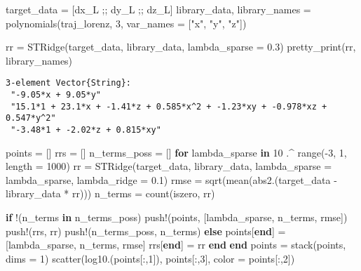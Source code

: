 \documentclass[
]{article}
\newenvironment{Shaded}{\begin{snugshade}}{\end{snugshade}}
\newcommand{\ControlFlowTok}[1]{\textcolor[rgb]{0.00,0.23,0.31}{\textbf{#1}}}
\newcommand{\FloatTok}[1]{\textcolor[rgb]{0.68,0.00,0.00}{#1}}
\newcommand{\FunctionTok}[1]{\textcolor[rgb]{0.28,0.35,0.67}{#1}}
\newcommand{\KeywordTok}[1]{\textcolor[rgb]{0.00,0.23,0.31}{\textbf{#1}}}
\newcommand{\NormalTok}[1]{\textcolor[rgb]{0.00,0.23,0.31}{#1}}
\newcommand{\OperatorTok}[1]{\textcolor[rgb]{0.37,0.37,0.37}{#1}}
\newcommand{\StringTok}[1]{\textcolor[rgb]{0.13,0.47,0.30}{#1}}
\begin{document}
\begin{Shaded}
\begin{Highlighting}[]
\NormalTok{target\_data }\OperatorTok{=}\NormalTok{ [dx\_L ;; dy\_L ;; dz\_L]}
\NormalTok{library\_data, library\_names }\OperatorTok{=} \FunctionTok{polynomials}\NormalTok{(traj\_lorenz, }\FloatTok{3}\NormalTok{, var\_names }\OperatorTok{=}\NormalTok{ [}\StringTok{"x"}\NormalTok{, }\StringTok{"y"}\NormalTok{, }\StringTok{"z"}\NormalTok{])}

\NormalTok{rr }\OperatorTok{=} \FunctionTok{STRidge}\NormalTok{(target\_data, library\_data, lambda\_sparse }\OperatorTok{=} \FloatTok{0.3}\NormalTok{)}
\FunctionTok{pretty\_print}\NormalTok{(rr, library\_names)}
\end{Highlighting}
\end{Shaded}

\begin{verbatim}
3-element Vector{String}:
 "-9.05*x + 9.05*y"
 "15.1*1 + 23.1*x + -1.41*z + 0.585*x^2 + -1.23*xy + -0.978*xz + 0.547*y^2"
 "-3.48*1 + -2.02*z + 0.815*xy"
\end{verbatim}

\begin{Shaded}
\begin{Highlighting}[]
\NormalTok{points }\OperatorTok{=}\NormalTok{ []}
\NormalTok{rrs }\OperatorTok{=}\NormalTok{ []}
\NormalTok{n\_terms\_poss }\OperatorTok{=}\NormalTok{ []}
\ControlFlowTok{for}\NormalTok{ lambda\_sparse }\KeywordTok{in} \FloatTok{10} \OperatorTok{.\^{}} \FunctionTok{range}\NormalTok{(}\OperatorTok{{-}}\FloatTok{3}\NormalTok{, }\FloatTok{1}\NormalTok{, length }\OperatorTok{=} \FloatTok{1000}\NormalTok{)}
\NormalTok{  rr }\OperatorTok{=} \FunctionTok{STRidge}\NormalTok{(target\_data, library\_data, lambda\_sparse }\OperatorTok{=}\NormalTok{ lambda\_sparse, lambda\_ridge }\OperatorTok{=} \FloatTok{0.1}\NormalTok{)}
\NormalTok{  rmse }\OperatorTok{=} \FunctionTok{sqrt}\NormalTok{(}\FunctionTok{mean}\NormalTok{(}\FunctionTok{abs2}\NormalTok{.(target\_data }\OperatorTok{{-}}\NormalTok{ library\_data }\OperatorTok{*}\NormalTok{ rr)))}
\NormalTok{  n\_terms }\OperatorTok{=} \FunctionTok{count}\NormalTok{(iszero, rr)}

  \ControlFlowTok{if}\NormalTok{ !(n\_terms }\KeywordTok{in}\NormalTok{ n\_terms\_poss)}
    \FunctionTok{push!}\NormalTok{(points, [lambda\_sparse, n\_terms, rmse])}
    \FunctionTok{push!}\NormalTok{(rrs, rr)}
    \FunctionTok{push!}\NormalTok{(n\_terms\_poss, n\_terms)}
  \ControlFlowTok{else}
\NormalTok{    points[}\KeywordTok{end}\NormalTok{] }\OperatorTok{=}\NormalTok{ [lambda\_sparse, n\_terms, rmse]}
\NormalTok{    rrs[}\KeywordTok{end}\NormalTok{] }\OperatorTok{=}\NormalTok{ rr}
  \ControlFlowTok{end}
\ControlFlowTok{end}
\NormalTok{points }\OperatorTok{=} \FunctionTok{stack}\NormalTok{(points, dims }\OperatorTok{=} \FloatTok{1}\NormalTok{)}
\FunctionTok{scatter}\NormalTok{(}\FunctionTok{log10}\NormalTok{.(points[}\OperatorTok{:}\NormalTok{,}\FloatTok{1}\NormalTok{]), points[}\OperatorTok{:}\NormalTok{,}\FloatTok{3}\NormalTok{], color }\OperatorTok{=}\NormalTok{ points[}\OperatorTok{:}\NormalTok{,}\FloatTok{2}\NormalTok{])}
\end{Highlighting}
\end{Shaded}
\end{document}
